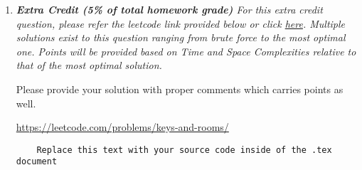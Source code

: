 \documentclass[12pt]{article}
\begin{document}
\begin{enumerate}
	\item{\itshape \textbf{Extra Credit (5\% of total homework grade)}
		For this extra credit question, please refer the leetcode link provided below or click \href{https://leetcode.com/problems/keys-and-rooms/}{here}. Multiple solutions exist to this question ranging from brute force to the most optimal one. Points will be provided based on Time and Space Complexities relative to that of the most optimal solution.
		
		Please provide your solution with proper comments which carries points as well.}
	
	\url{https://leetcode.com/problems/keys-and-rooms/}
	
	\begin{verbatim}
	Replace this text with your source code inside of the .tex document
	\end{verbatim}	
	
	
\end{enumerate}
\end{document}
